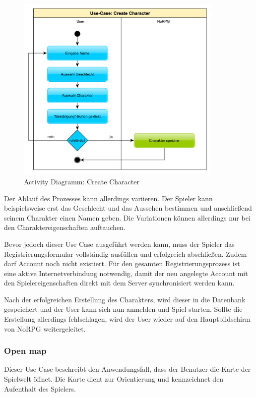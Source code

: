 			\begin{figure}[htbp]
				\centering 
				\label{createCharakter}
				\includegraphics[width=10cm]{pics/CreateCharacter.pdf}
				\caption{Activity Diagramm: Create Character}
			\end{figure}
		
			Der Ablauf des Prozesses kann allerdings variieren. Der Spieler kann beispielsweise erst das Geschlecht und das Aussehen bestimmen und anschließend seinem Charakter einen Namen geben. Die Variationen können allerdings nur bei den Charaktereigenschaften auftauchen.
	
			Bevor jedoch dieser Use Case ausgeführt werden kann, muss der Spieler das Registrierungsformular vollständig ausfüllen und erfolgreich abschließen. Zudem darf Account noch nicht existiert. Für den gesamten Registrierungsprozess ist eine aktive Internetverbindung notwendig, damit der neu angelegte Account mit den Spielereigenschaften direkt mit dem Server synchronisiert werden kann.
			
			Nach der erfolgreichen Erstellung des Charakters, wird dieser in die Datenbank gespeichert und der User kann sich nun anmelden und Spiel starten. Sollte die Erstellung allerdings fehlschlagen, wird der User wieder auf den Hauptbildschirm von NoRPG weitergeleitet. 
			
		\subsubsection{Open map}
			Dieser Use Case beschreibt den Anwendungsfall, dass der Benutzer die Karte der Spielwelt öffnet. Die Karte dient zur Orientierung und kennzeichnet den Aufenthalt des Spielers.
			
